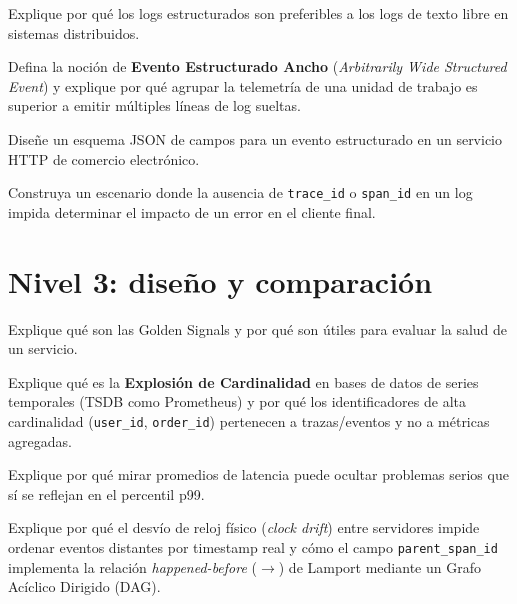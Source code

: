 \documentclass[variant=guia,cover=institutional,mode=screen]{ua-engineering-v6-article}
\begin{document}
\begin{uaexercise}
Explique por qué los logs estructurados son preferibles a los logs de texto libre en sistemas distribuidos.
\end{uaexercise}

\begin{uaexercise}
Defina la noción de \textbf{Evento Estructurado Ancho} (\emph{Arbitrarily Wide Structured Event}) y explique por qué agrupar la telemetría de una unidad de trabajo es superior a emitir múltiples líneas de log sueltas.
\end{uaexercise}

\begin{uaexercise}
Diseñe un esquema JSON de campos para un evento estructurado en un servicio HTTP de comercio electrónico.
\end{uaexercise}

\begin{uaexercise}
Construya un escenario donde la ausencia de \texttt{trace\_id} o \texttt{span\_id} en un log impida determinar el impacto de un error en el cliente final.
\end{uaexercise}


\section{Nivel 3: diseño y comparación}
\begin{uaexercise}
Explique qué son las Golden Signals y por qué son útiles para evaluar la salud de un servicio.
\end{uaexercise}

\begin{uaexercise}
Explique qué es la \textbf{Explosión de Cardinalidad} en bases de datos de series temporales (TSDB como Prometheus) y por qué los identificadores de alta cardinalidad (\texttt{user\_id}, \texttt{order\_id}) pertenecen a trazas/eventos y no a métricas agregadas.
\end{uaexercise}

\begin{uaexercise}
Explique por qué mirar promedios de latencia puede ocultar problemas serios que sí se reflejan en el percentil p99.
\end{uaexercise}

\begin{uaexercise}
Explique por qué el desvío de reloj físico (\emph{clock drift}) entre servidores impide ordenar eventos distantes por timestamp real y cómo el campo \texttt{parent\_span\_id} implementa la relación \emph{happened-before} ($\rightarrow$) de Lamport mediante un Grafo Acíclico Dirigido (DAG).
\end{uaexercise}
\end{document}
